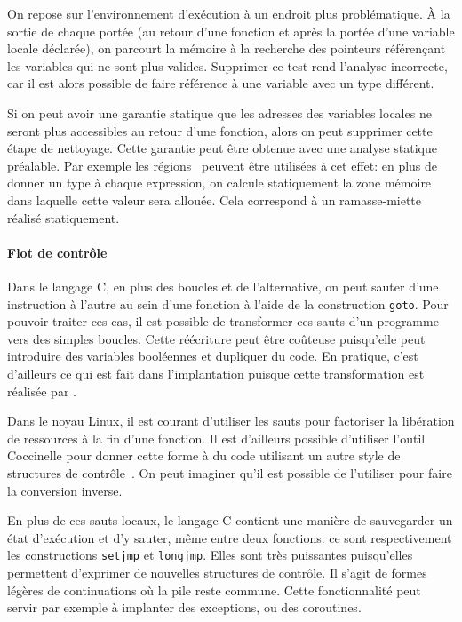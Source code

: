 On repose sur l'environnement d'exécution à un endroit plus problématique. À la
sortie de chaque portée (au retour d'une fonction et après la portée d'une
variable locale déclarée), on parcourt la mémoire à la recherche des pointeurs
référençant les variables qui ne sont plus valides. Supprimer ce test rend
l'analyse incorrecte, car il est alors possible de faire référence à une
variable avec un type différent.

Si on peut avoir une garantie statique que les adresses des variables locales ne
seront plus accessibles au retour d'une fonction, alors on peut supprimer cette
étape de nettoyage. Cette garantie peut être obtenue avec une analyse statique
préalable. Par exemple les régions~\cite{jfp92} peuvent être utilisées à cet
effet: en plus de donner un type à chaque expression, on calcule
statiquement la zone mémoire dans laquelle cette valeur sera allouée. Cela
correspond à un ramasse-miette réalisé statiquement.


\paragraph{Flot de contrôle}

Dans le langage C, en plus des boucles et de l'alternative, on peut sauter d'une
instruction à l'autre au sein d'une fonction à l'aide de la construction
\texttt{goto}. Pour pouvoir traiter ces cas, il est possible de transformer ces
sauts d'un programme vers des simples boucles. Cette réécriture peut être
coûteuse puisqu'elle peut introduire des variables booléennes et dupliquer du
code. En pratique, c'est d'ailleurs ce qui est fait dans l'implantation puisque
cette transformation est réalisée par \ctonewspeak.

Dans le noyau Linux, il est courant d'utiliser les sauts pour factoriser la
libération de ressources à la fin d'une fonction. Il est d'ailleurs possible
d'utiliser l'outil Coccinelle pour donner cette forme à du code utilisant un
autre style de structures de contrôle~\cite{lctes11}. On peut imaginer qu'il est
possible de l'utiliser pour faire la conversion inverse.

En plus de ces sauts locaux, le langage C contient une manière de sauvegarder un
état d'exécution et d'y sauter, même entre deux fonctions: ce sont
respectivement les constructions \texttt{setjmp} et \texttt{longjmp}. Elles sont
très puissantes puisqu'elles permettent d'exprimer de nouvelles structures de
contrôle. Il s'agit de formes légères de continuations où la pile reste commune.
Cette fonctionnalité peut servir par exemple à implanter des exceptions, ou des
coroutines.


